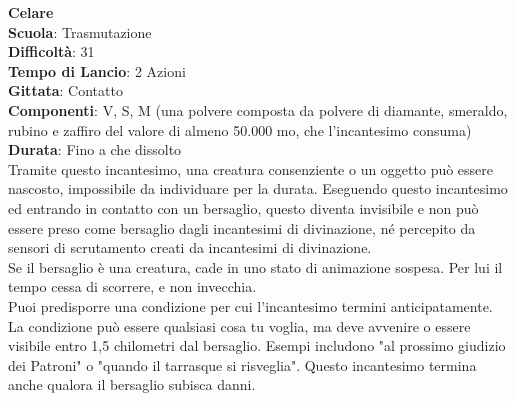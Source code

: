 \begin{multicols}{2}
\medskip\textbf{Celare}\\
\textbf{Scuola}: Trasmutazione\\
\textbf{Difficoltà}: 31\\
\textbf{Tempo di Lancio}: 2 Azioni\\
\textbf{Gittata}: Contatto\\
\textbf{Componenti}: V, S, M (una polvere composta da polvere di diamante, smeraldo, rubino e zaffiro del valore di almeno 50.000 mo, che l'incantesimo consuma)\\
\textbf{Durata}: Fino a che dissolto \\
Tramite questo incantesimo, una creatura consenziente o un oggetto può essere nascosto, impossibile da individuare per la durata. Eseguendo questo incantesimo ed entrando in contatto con un bersaglio, questo diventa invisibile e non può essere preso come bersaglio dagli incantesimi di divinazione, né percepito da sensori di scrutamento creati da incantesimi di divinazione.\\
Se il bersaglio è una creatura, cade in uno stato di animazione sospesa. Per lui il tempo cessa di scorrere, e non invecchia. \\
Puoi predisporre una condizione per cui l'incantesimo termini anticipatamente. La condizione può essere qualsiasi cosa tu voglia, ma deve avvenire o essere visibile entro 1,5 chilometri dal bersaglio. Esempi includono "al prossimo giudizio dei Patroni" o "quando il tarrasque si risveglia". Questo incantesimo termina anche qualora il bersaglio subisca danni.



\end{multicols}
